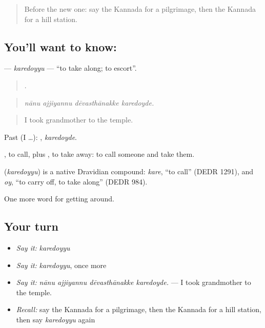 \label{lesson:KA-C458-karedoyyu}



\begin{quote}
Before the new one: say the Kannada for a pilgrimage, then the Kannada for a hill station.
\end{quote}

\subsection*{You'll want to know: }
\textbf{} — \emph{karedoyyu} — \textquotedblleft{}to take along; to escort\textquotedblright{}.

\begin{quote}
   .
\end{quote}

\begin{quote}
\emph{nānu ajjiyannu dēvasthānakke karedoyde.}
\end{quote}

\begin{quote}
I took grandmother to the temple.
\end{quote}

Past (I …): , \emph{karedoyde}.

, to call, plus , to take away: to call someone and take them.

\begin{cousinweb}
\textbf{} (\emph{karedoyyu}) is a native Dravidian compound: \emph{kare}, \textquotedblleft{}to call\textquotedblright{} (DEDR 1291), and \emph{oy}, \textquotedblleft{}to carry off, to take along\textquotedblright{} (DEDR 984).
\end{cousinweb}

\begin{grammarlens}[title={What you've built}]
One more word for getting around.
\end{grammarlens}

\subsection*{Your turn}
\begin{itemize}
\raggedright
  \item \emph{Say it:} \emph{karedoyyu}
  \item \emph{Say it:} \emph{karedoyyu}, once more
  \item \emph{Say it:} \emph{nānu ajjiyannu dēvasthānakke karedoyde.} — I took grandmother to the temple.
  \item \emph{Recall:} say the Kannada for a pilgrimage, then the Kannada for a hill station, then say \emph{karedoyyu} again
\end{itemize}

